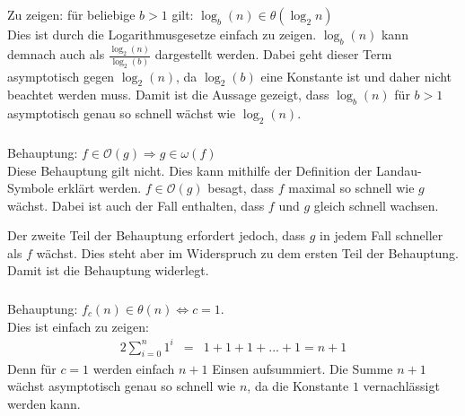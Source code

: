 \documentclass[10pt,a4paper,oneside,ngerman,numbers=noenddot]{scrartcl}
\begin{document}
	\subsection{} %
		\subsubsection{} %
		Zu zeigen: für beliebige $b > 1$ gilt: $\log_{b}(n) \in \mathcal{\theta} (\log_{2}n)$\\
		Dies ist durch die Logarithmusgesetze einfach zu zeigen. $\log_{b}(n)$ kann demnach auch als $\frac{\log_{2}(n)}{\log_{2}(b)}$ dargestellt werden. Dabei geht dieser Term asymptotisch gegen $\log_{2}(n)$, da $\log_{2}(b)$ eine Konstante ist und daher nicht beachtet werden muss. Damit ist die Aussage gezeigt, dass $\log_{b}(n)$ für $b > 1$ asymptotisch genau so schnell wächst wie $\log_{2}(n)$.
		\subsubsection{} %
		Behauptung: $f \in \mathcal{O}(g) \Rightarrow g \in \omega (f)$\\
		Diese Behauptung gilt nicht. Dies kann mithilfe der Definition der Landau-Symbole erklärt werden. $f \in \mathcal{O}(g)$ besagt, dass $f$ maximal so schnell wie $g$ wächst. Dabei ist auch der Fall enthalten, dass $f$ und $g$ gleich schnell wachsen.
		
		Der zweite Teil der Behauptung erfordert jedoch, dass $g$ in jedem Fall schneller als $f$ wächst. Dies steht aber im Widerspruch zu dem ersten Teil der Behauptung. Damit ist die Behauptung widerlegt. 
		\subsubsection{} %
		Behauptung: $f_{c}(n) \in \theta(n) \Leftrightarrow c = 1$.\\
		Dies ist einfach zu zeigen:\\
		\begin{alignat*}{2}
		\sum\limits_{i=0}^{n} 1^{i} &=& 1 + 1 + 1 + ... + 1 = n + 1
		\end{alignat*}
		Denn für $c=1$ werden einfach $n+1$ Einsen aufsummiert. Die Summe $n+1$ wächst asymptotisch genau so schnell wie $n$, da die Konstante $1$ vernachlässigt werden kann.
		
\section{} %
\end{document}

